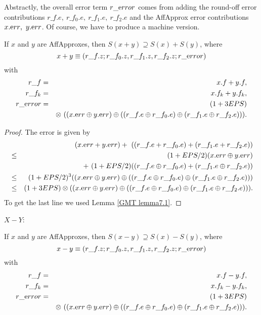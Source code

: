 Abstractly, the overall error term $r\_{\textrm error}$ comes from adding the round-off error contributions $r\_f.e,\  r\_f_0.e,\  r\_f_1.e, 
\ r\_f_2.e$ and the AffApprox error contributions $x.{\textrm err},\  y.{\textrm err}$.  Of course, we have to produce a machine version.

\begin{proposition}\label{GMT prop8.2} If $x$ and $y$ are 
{\textrm AffApproxes, }
then $S(x + y) \supseteq S(x) + S(y)${\textrm ,} where
$$x + y \equiv (r\_f.z; r\_f_0.z, r\_f_1.z, r\_f_2.z; r\_{\textrm error})$$
with
\begin{eqnarray*}
r\_f &=& x.f + y.f,\\
r\_f_k &=& x.f_k + y.f_k,\\
r\_{\textrm error}& =& (1 + 3EPS)\\
&&\otimes\ ((x.{\textrm err} \oplus y.{\textrm err}) \oplus ((r\_f.e \oplus
r\_f_0.e) \oplus (r\_f_1.e \oplus r\_f_2.e))).
\end{eqnarray*}
\end{proposition}

\begin{proof}{}
The error is given by 
\begin{eqnarray*}
&&\hskip-24pt (x.{\textrm err} + y.{\textrm err})  +\ ((r\_f.e + r\_f_0.e) + (r\_f_1.e + r\_f_2.e))\\
&\le& (1+EPS/2) (x.{\textrm err} \oplus
y.{\textrm err}) \\
&&+\ (1+EPS/2)((r\_f.e \oplus r\_f_0.e) + (r\_f_1.e \oplus r\_f_2.e))\\
&\le& (1+EPS/2)^3 ((x.{\textrm err} \oplus
y.{\textrm err}) \oplus ((r\_f.e \oplus r\_f_0.e) \oplus (r\_f_1.e \oplus r\_f_2.e)))\\
&\le& (1 + 3EPS) \otimes ((x.{\mathrm
err} \oplus y.{\textrm err}) \oplus ((r\_f.e \oplus r\_f_0.e) \oplus (r\_f_1.e \oplus r\_f_2.e))).
\end{eqnarray*}
 To get the last line
we used Lemma \ref{GMT lemma7.1}. \end{proof}

$X - Y$:

\begin{proposition}\label{GMT prop8.3} If $x$ and $y$ are {\textrm AffApproxes,} then $S(x - y) \supseteq S(x) - S(y)${\textrm ,}
 where
$$x - y \equiv (r\_f.z; r\_f_0.z, r\_f_1.z, r\_f_2.z; r\_{\textrm error})$$
with
\begin{eqnarray*}
r\_f& =& x.f - y.f,\\
r\_f_k &= &x.f_k - y.f_k,\\
r\_{\textrm error} &=& (1 + 3EPS)\\
&& \otimes\ ((x.{\textrm err} \oplus y.{\textrm err}) \oplus ((r\_f.e
\oplus r\_f_0.e) \oplus (r\_f_1.e \oplus r\_f_2.e))).
\end{eqnarray*}
\end{proposition}

